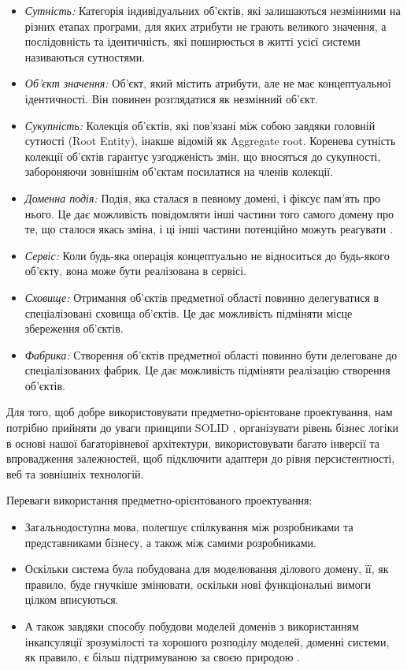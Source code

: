 \begin{itemize}
	\item \emph{Сутність:} Категорія індивідуальних об'єктів,
		які залишаються незмінними на різних етапах програми,
		для яких атрибути не грають великого значення, а послідовність та ідентичність,
		які поширюється в житті усієї системи називаються сутностями.
	\item \emph{Об'єкт значення:} Об'єкт, який містить атрибути,
		але не має концептуальної ідентичності. Він повинен розглядатися як незмінний об'єкт.
	\item \emph{Сукупність:} Колекція об'єктів, які пов'язані між собою завдяки
		головній сутності (Root Entity), інакше відомій як Aggregate root.
		Коренева сутність колекції об'єктів гарантує узгодженість змін,
		що вносяться до сукупності, забороняючи зовнішнім об'єктам посилатися на членів колекції.
	\item \emph{Доменна подія:} Подія, яка сталася в певному домені, і фіксує пам'ять про нього.
		Це дає можливість повідомляти інші частини того самого домену про те,
		що сталося якась зміна, і ці інші частини потенційно можуть реагувати \cite{de-article}.
	\item \emph{Сервіс:} Коли будь-яка операція концептуально не відноситься до будь-якого об'єкту,
		вона може бути реалізована в сервісі.
	\item \emph{Сховище:} Отримання об'єктів предметної області повинно делегуватися
		в спеціалізовані сховища об'єктів. Це дає можливість підміняти місце збереження об'єктів.
	\item \emph{Фабрика:} Створення об'єктів предметної області повинно бути делеговане до
		спеціалізованих фабрик. Це дає можливість підміняти реалізацію створення об'єктів.
\end{itemize}

Для того, щоб добре використовувати предметно-орієнтоване проектування,
нам потрібно прийняти до уваги принципи SOLID \cite{solid-martin},
організувати рівень бізнес логіки в основі нашої багаторівневої архітектури,
використовувати багато інверсії та впровадження залежностей,
щоб підключити адаптери до рівня персистентності, веб та зовнішніх технологій.

Переваги використання предметно-орієнтованого проектування:

\begin{itemize}
		\item Загальнодоступна мова, полегшує спілкування між
			розробниками та представниками бізнесу, а також між самими розробниками.
		\item Оскільки система була побудована для моделювання ділового домену,
			її, як правило, буде гнучкіше змінювати,
			оскільки нові функціональні вимоги цілком вписуються.
		\item А також завдяки способу побудови моделей доменів з використанням
			інкапсуляції зрозумілості та хорошого розподілу моделей,
			доменні системи, як правило, є більш підтримуваною за своєю природою \cite{ddd-pros-cons}.
\end{itemize}


